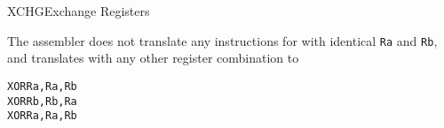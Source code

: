 \begin{instruction}{XCHG}{Exchange Registers}
\begin{remarks}
The assembler does not translate any instructions for \texttt{\mnemonic} with identical \texttt{Ra} and \texttt{Rb}, and translates \texttt{\mnemonic} with any other register combination to
\begin{alltt}
    XOR  Ra, Ra, Rb
    XOR  Rb, Rb, Ra
    XOR  Ra, Ra, Rb
\end{alltt}
\end{remarks}
\end{instruction}
